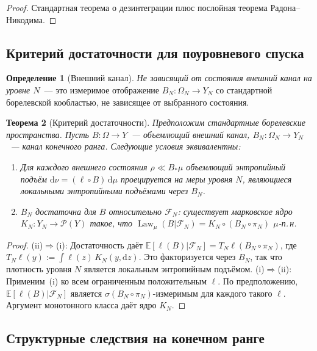 \documentclass[12pt,a4paper]{article}
\theoremstyle{plain}
\newtheorem{theorem}{Теорема}[section]
\theoremstyle{definition}
\newtheorem{definition}[theorem]{Определение}
\theoremstyle{remark}
\newcommand{\dd}{\mathrm{d}}
\newcommand{\cF}{\mathcal{F}}
\newcommand{\cP}{\mathcal{P}}
\newcommand{\E}{\mathbb{E}}
\newcommand{\Law}{\operatorname{Law}}
\begin{document}
\begin{proof}
Стандартная теорема о дезинтеграции плюс послойная теорема
Радона--Никодима.
\end{proof}

\subsection{Критерий достаточности для поуровневого спуска}

\begin{definition}[Внешний канал]
\emph{Не зависящий от состояния внешний канал на уровне $N$}~---
это измеримое отображение $B_N\colon \Omega_N \to Y_N$ со стандартной
борелевской кообластью, не зависящее от выбранного состояния.
\end{definition}

\begin{theorem}[Критерий достаточности]
\label{thm:sufficiency}
Предположим стандартные борелевские пространства.  Пусть
$B\colon \Omega \to Y$~--- объемлющий внешний канал,
$B_N\colon \Omega_N \to Y_N$~--- канал конечного ранга.
Следующие условия эквивалентны:
\begin{enumerate}[label=\textup{(\roman*)},leftmargin=2.5em]
  \item Для каждого внешнего состояния $\rho \ll B_*\mu$ объемлющий
    энтропийный подъём $\dd\nu = (\ell\circ B)\,\dd\mu$ проецируется
    на меры уровня $N$, являющиеся локальными энтропийными подъёмами
    через $B_N$.
  \item $B_N$ достаточна для $B$ относительно $\cF_N$: существует
    марковское ядро $K_N\colon Y_N \to \cP(Y)$ такое, что
    $\Law_\mu(B|\cF_N) = K_N \circ (B_N \circ \pi_N)$
    $\mu$-п.\,н.
\end{enumerate}
\end{theorem}

\begin{proof}
(ii)$\Rightarrow$(i): Достаточность даёт
$\E[\ell(B)|\cF_N] = T_N\ell(B_N\circ\pi_N)$, где
$T_N\ell(y) := \int\ell(z)\,K_N(y,\dd z)$.  Это факторизуется
через $B_N$, так что плотность уровня $N$ является локальным
энтропийным подъёмом.
(i)$\Rightarrow$(ii): Применим~(i) ко всем ограниченным
положительным $\ell$.  По предположению,
$\E[\ell(B)|\cF_N]$ является
$\sigma(B_N\circ\pi_N)$-измеримым для каждого такого $\ell$.
Аргумент монотонного класса даёт ядро $K_N$.
\end{proof}

\subsection{Структурные следствия на конечном ранге}
\end{document}
